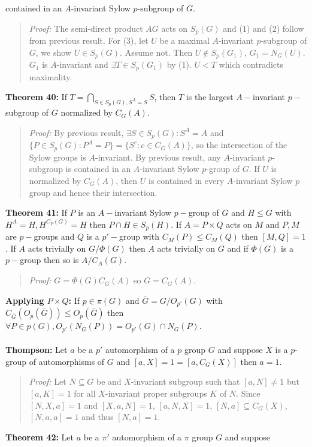 contained in an $A$-invariant Sylow $p$-subgroup of $G$.
\begin{quote}
\emph{Proof:}  The semi-direct product $AG$ acts on $S_p(G)$ and (1) and (2) follow from previous result.
For (3), let $U$ be a maximal $A$-invariant $p$-subgroup of $G$, we show $U \in S_p(G)$. Assume not.  Then $U \notin S_p(G_1)$, $G_1 = N_G(U)$.  $G_1$ is $A$-invariant and $\exists T \in S_p(G_1)$
by (1).  $U<T$ which contradicts maximality.
\end{quote}
{\bf Theorem 40:}
If $T=\bigcap_{S \in S_p(G), S^A=S} S$,
then $T$ is the largest $A-$invariant $p-$subgroup of $G$ normalized by $C_G(A)$.
\begin{quote}
\emph{Proof:}  By previous result, $\exists S \in S_p(G): S^A=A$ and
$\{P \in S_p(G): P^A=P \} = \{S^c: c \in C_G(A) \}$, so the intersection of the Sylow groups is
$A$-invariant. By previous result, any $A$-invariant $p$-subgroup is contained in an $A$-invariant
Sylow $p$-group of $G$.  If $U$ is normalized by $C_G(A)$, then $U$ is contained in every $A$-invariant
Sylow $p$ group and hence their intersection.
\end{quote}
{\bf Theorem 41:}
If $P$ is an $A-$invariant Sylow $p-$group of $G$ and $H \le G$ with $H^A=H, H^{C_P(G)}=H$ then
$P \cap H \in S_p(H)$.  If $A= P \times Q$ acts on $M$ and $P, M$ are $p-$groups and
$Q$ is a $p'-$group with $C_M(P) \le C_M(Q)$ then $[M,Q]=1$. If $A$ acts trivially on
$G/\Phi(G)$ then $A$ acts trivially on $G$ and if $\Phi(G)$ is a $p-$group then
so is $A/C_A(G)$. \begin{quote}
\emph{Proof:}  $G= \Phi(G) C_G(A)$ so $G= C_G(A)$.
\end{quote}
{\bf Applying $P \times Q$:} If $p \in \pi(G)$ and ${\overline G}= G/O_{p'}(G)$
with $C_{\overline G}(O_p({\overline G})) \le O_p({\overline G})$ then $\forall P \in p(G), O_{p'}(N_G(P))=O_{p'}(G) \cap N_G(P)$.
\\
\\
{\bf Thompson:} Let $a$ be a $p'$ automorphism of a $p$ group $G$ and suppose
$X$ is a $p$-group of automorphisms of $G$ and
$[a,X]=1=[a,C_G(X)]$ then $a=1$.
\begin{quote}
\emph{Proof:}  Let $N \subseteq G$ be and $X$-invariant subgroup such that $[a,N] \ne 1$ but
$[a, K]= 1$ for all $X$-invariant proper subgroups $K$ of $N$.  Since
$[N,X,a]=1$ and $[X,a,N]=1$,  $[a, N, X] = 1$, $[N,a] \subseteq C_G(X)$,
$[N,a,a]= 1$ and thus $[N,a]= 1$.
\end{quote}
{\bf Theorem 42:} Let $a$ be a $\pi'$ automorphism of a $\pi$ group $G$ and suppose
